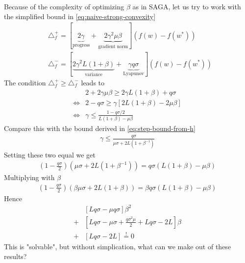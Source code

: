 \documentclass{article}
\begin{document}
Because of the complexity of optimizing $\beta$ as in SAGA, let us try to work with the simplified bound in \eqref{eq:naive-strong-convexity}
\begin{align}
& \triangle_f^+ = \left[ \underbrace{2\gamma}_{\text{progress}} + \underbrace{2 \gamma^2 \mu \beta}_{\text{gradient norm}} \right] 
(f(w) - f(w^*)) \\
& \triangle_f^- = \left[ \underbrace{2\gamma^2 L (1+\beta)}_{\text{variance}} 
+  \underbrace{\gamma  q\sigma}_{\text{Lyapunov}} \right]  (f(w)-f(w^*)) 
\end{align}
The condition $\triangle_f^+ \geq \triangle_f^-$ leads to 
\begin{align}
& 2 + 2 \gamma \mu \beta \ge 2 \gamma L (1+\beta) + q \sigma \\
\iff & 2 -q \sigma \ge \gamma \left[ 2 L (1+\beta) - 2 \mu \beta \right] \\
\iff & \gamma \le \frac{1 -q \sigma/2}{L (1+\beta) - \mu \beta}
\end{align}
Compare this with the bound derived in \eqref{eq:step-bound-from-h}
\begin{align}
\gamma \le  \frac {q \sigma}  {\mu \sigma +  2L \left(1 + \beta^{-1} \right)} 
\end{align}
Setting these two equal we get 
\begin{align}
\left( 1- \frac {q \sigma}{2} \right) \left( \mu \sigma +  2L \left(1 + \beta^{-1} \right) \right) = 
q \sigma ( L (1+\beta) - \mu \beta  )
\end{align}
Multiplying with $\beta$ 
\begin{align}
\left(1 - \frac{q \sigma}{2} \right) \left( \beta \mu \sigma +  2L \left( 1 + \beta  \right) \right) = 
\beta q \sigma ( L (1+\beta) - \mu \beta  )
\end{align}
Hence 
\begin{align}
& \left[  L q \sigma  - \mu q \sigma \right] \beta^2 \nonumber 
\\ + & \left[  L q \sigma - \mu \sigma + \frac{q \sigma^2 \mu}{2} + L q \sigma - 2L \right] \beta   
\\ + & \left[ L q \sigma - 2 L \right] \stackrel{!}=0 \nonumber 
\end{align}
This is "solvable", but without simplication, what can we make out of these results? 
\end{document}
